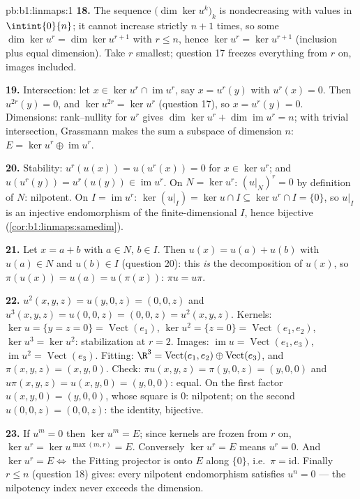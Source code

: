\begin{solution}{pb:b1:linmaps:1}
\textbf{18.} The sequence $\bigl(\dim\ker u^k\bigr)_k$ is
nondecreasing with values in $\intint{0}{n}$; it cannot increase
strictly $n + 1$ times, so some $\dim\ker u^{r} = \dim\ker
u^{r+1}$ with $r \leq n$, hence $\ker u^{r} = \ker u^{r+1}$
(inclusion plus equal dimension). Take $r$ smallest; question 17
freezes everything from $r$ on, images included.

\textbf{19.} Intersection: let $x \in \ker u^{r} \cap
\operatorname{im} u^{r}$, say $x = u^{r}(y)$ with $u^{r}(x) =
0$. Then $u^{2r}(y) = 0$, and $\ker u^{2r} = \ker u^{r}$
(question 17), so $x = u^{r}(y) = 0$. Dimensions: rank--nullity
for $u^{r}$ gives $\dim\ker u^{r} + \dim\operatorname{im} u^{r}
= n$; with trivial intersection, Grassmann makes the sum a
subspace of dimension $n$: $E = \ker u^{r} \oplus
\operatorname{im} u^{r}$.

\textbf{20.} Stability: $u^{r}(u(x)) = u(u^{r}(x)) = 0$ for $x
\in \ker u^{r}$; and $u(u^{r}(y)) = u^{r}(u(y)) \in
\operatorname{im} u^{r}$. On $N = \ker u^{r}$: $(u|_N)^{r} = 0$
by definition of $N$: nilpotent. On $I = \operatorname{im}
u^{r}$: $\ker(u|_I) = \ker u \cap I \subseteq \ker u^{r} \cap I
= \{0\}$, so $u|_I$ is an injective endomorphism of the
finite-dimensional $I$, hence bijective
(\cref{cor:b1:linmaps:samedim}).

\textbf{21.} Let $x = a + b$ with $a \in N$, $b \in I$. Then
$u(x) = u(a) + u(b)$ with $u(a) \in N$ and $u(b) \in I$
(question 20): this \emph{is} the decomposition of $u(x)$, so
$\pi(u(x)) = u(a) = u(\pi(x))$: $\pi u = u\pi$.

\textbf{22.} $u^2(x,y,z) = u(y, 0, z) = (0, 0, z)$ and
$u^3(x,y,z) = u(0,0,z) = (0,0,z) = u^2(x,y,z)$. Kernels: $\ker u
= \{y = z = 0\} = \operatorname{Vect}(e_1)$, $\ker u^2 = \{z =
0\} = \operatorname{Vect}(e_1, e_2)$, $\ker u^3 = \ker u^2$:
stabilization at $r = 2$. Images: $\operatorname{im} u =
\operatorname{Vect}(e_1, e_3)$, $\operatorname{im} u^2 =
\operatorname{Vect}(e_3)$. Fitting: $\R^3 =
\operatorname{Vect}(e_1, e_2) \oplus \operatorname{Vect}(e_3)$,
and $\pi(x, y, z) = (x, y, 0)$. Check: $\pi u(x,y,z) = \pi(y, 0,
z) = (y, 0, 0)$ and $u\pi(x,y,z) = u(x, y, 0) = (y, 0, 0)$:
equal. On the first factor $u(x, y, 0) = (y, 0, 0)$, whose
square is $0$: nilpotent; on the second $u(0,0,z) = (0,0,z)$:
the identity, bijective.

\textbf{23.} If $u^m = 0$ then $\ker u^m = E$; since kernels are
frozen from $r$ on, $\ker u^{r} = \ker u^{\max(m, r)} = E$.
Conversely $\ker u^{r} = E$ means $u^{r} = 0$. And $\ker u^{r} =
E \iff$ the Fitting projector is onto $E$ along $\{0\}$, i.e.\
$\pi = \mathrm{id}$. Finally $r \leq n$ (question 18) gives:
every nilpotent endomorphism satisfies $u^{n} = 0$ --- the
nilpotency index never exceeds the dimension.


\end{solution}
